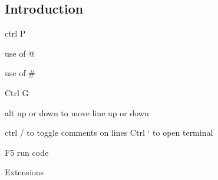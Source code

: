 
\subsection{Introduction}

ctrl P

use of @

use of \#

Ctrl G

alt up or down to move line up or down

ctrl / to toggle comments on lines
Ctrl ` to open terminal

F5 run code

Extensions

